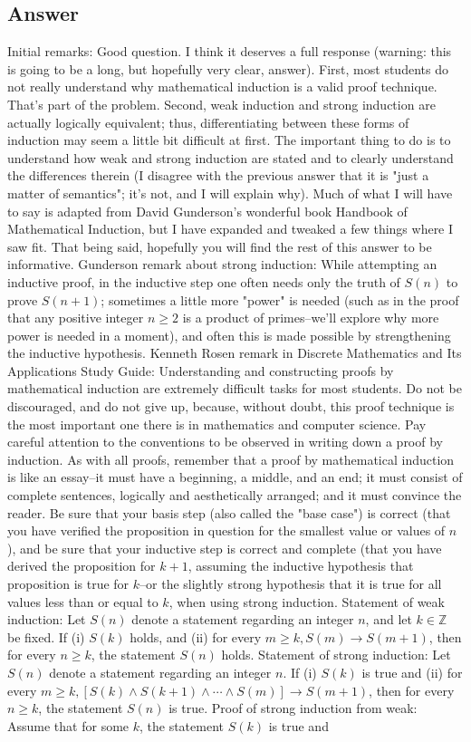 \documentclass{article}
\begin{document}
\subsection*{Answer}
Initial remarks: Good question. I think it deserves a full response (warning: this is going to be a long, but hopefully very clear, answer). First, most students do not really understand why mathematical induction is a valid proof technique. That's part of the problem. Second, weak induction and strong induction are actually logically equivalent; thus, differentiating between these forms of induction may seem a little bit difficult at first. The important thing to do is to understand how weak and strong induction are stated and to clearly understand the differences therein (I disagree with the previous answer that it is "just a matter of semantics"; it's not, and I will explain why). Much of what I will have to say is adapted from David Gunderson's wonderful book Handbook of Mathematical Induction, but I have expanded and tweaked a few things where I saw fit. That being said, hopefully you will find the rest of this answer to be informative. Gunderson remark about strong induction: While attempting an inductive proof, in the inductive step one often needs only the truth of $S(n)$ to prove $S(n+1)$; sometimes a little more "power" is needed (such as in the proof that any positive integer $n\geq 2$ is a product of primes--we'll explore why more power is needed in a moment), and often this is made possible by strengthening the inductive hypothesis. Kenneth Rosen remark in Discrete Mathematics and Its Applications Study Guide: Understanding and constructing proofs by mathematical induction are extremely difficult tasks for most students. Do not be discouraged, and do not give up, because, without doubt, this proof technique is the most important one there is in mathematics and computer science. Pay careful attention to the conventions to be observed in writing down a proof by induction. As with all proofs, remember that a proof by mathematical induction is like an essay--it must have a beginning, a middle, and an end; it must consist of complete sentences, logically and aesthetically arranged; and it must convince the reader. Be sure that your basis step (also called the "base case") is correct (that you have verified the proposition in question for the smallest value or values of $n$), and be sure that your inductive step is correct and complete (that you have derived the proposition for $k+1$, assuming the inductive hypothesis that proposition is true for $k$--or the slightly strong hypothesis that it is true for all values less than or equal to $k$, when using strong induction. Statement of weak induction: Let $S(n)$ denote a statement regarding an integer $n$, and let $k\in\mathbb{Z}$ be fixed. If (i) $S(k)$ holds, and (ii) for every $m\geq k, S(m)\to S(m+1)$, then for every $n\geq k$, the statement $S(n)$ holds. Statement of strong induction: Let $S(n)$ denote a statement regarding an integer $n$. If (i) $S(k)$ is true and (ii) for every $m\geq k, [S(k)\land S(k+1)\land\cdots\land S(m)]\to S(m+1)$, then for every $n\geq k$, the statement $S(n)$ is true. Proof of strong induction from weak: Assume that for some $k$, the statement $S(k)$ is true and 
\end{document}

